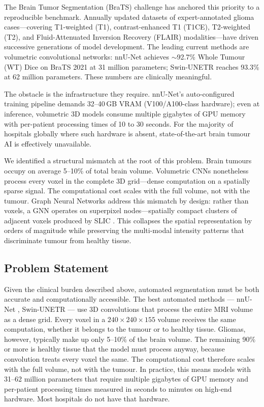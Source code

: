 \documentclass{article}
\begin{document}
The Brain Tumor Segmentation (BraTS) challenge \cite{menze2015multimodal, bakas2021brats}
has anchored this priority to a reproducible benchmark. Annually updated datasets of
expert-annotated glioma cases---covering T1-weighted (T1), contrast-enhanced T1
(T1CE), T2-weighted (T2), and Fluid-Attenuated Inversion Recovery (FLAIR)
modalities---have driven successive generations of model development. The leading
current methods are volumetric convolutional networks: nnU-Net
\cite{isensee2021nnunet} achieves $\sim$92.7\% Whole Tumour (WT) Dice on BraTS 2021
at 31 million parameters; Swin-UNETR \cite{hatamizadeh2022swin} reaches 93.3\% at 62
million parameters. These numbers are clinically meaningful.

The obstacle is the infrastructure they require. nnU-Net's auto-configured training
pipeline demands 32--40\,GB VRAM (V100/A100-class hardware); even at inference,
volumetric 3D models consume multiple gigabytes of GPU memory with per-patient
processing times of 10 to 30 seconds. For the majority of hospitals globally where
such hardware is absent, state-of-the-art brain tumour AI is effectively
unavailable.

We identified a structural mismatch at the root of this problem. Brain tumours occupy
on average 5--10\% of total brain volume. Volumetric CNNs nonetheless process every
voxel in the complete 3D grid---dense computation on a spatially sparse signal. The
computational cost scales with the full volume, not with the tumour. Graph Neural
Networks \cite{hamilton2017graphsage} address this mismatch by design: rather than
voxels, a GNN operates on superpixel nodes---spatially compact clusters of adjacent
voxels produced by SLIC \cite{achanta2012slic}. This collapses the spatial
representation by orders of magnitude while preserving the multi-modal intensity
patterns that discriminate tumour from healthy tissue.

\subsection{Problem Statement}
\label{sec:problem}

Given the clinical burden described above, automated segmentation must be both
accurate and computationally accessible. The best automated methods --- nnU-Net \cite{isensee2021nnunet}, Swin-UNETR
\cite{hatamizadeh2022swin} --- use 3D convolutions that process the entire MRI
volume as a dense grid. Every voxel in a $240 \times 240 \times 155$ volume
receives the same computation, whether it belongs to the tumour or to healthy
tissue. Gliomas, however, typically make up only 5--10\% of the brain volume.
The remaining 90\% or more is healthy tissue that the model must process anyway,
because convolution treats every voxel the same. The computational cost therefore
scales with the full volume, not with the tumour. In practice, this means models with 31--62 million parameters
\cite{isensee2021nnunet, hatamizadeh2022swin} that require multiple gigabytes
of GPU memory and per-patient processing times measured in seconds to minutes
on high-end hardware. Most hospitals do not have that hardware.
\end{document}
